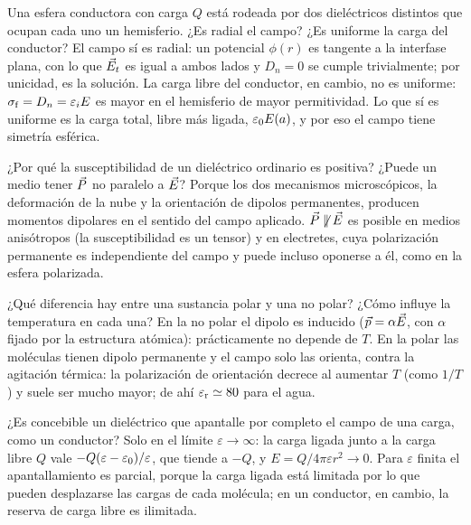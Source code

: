 \begin{pregunta}{Una esfera conductora con carga $Q$ está rodeada por dos dieléctricos distintos que ocupan cada uno un hemisferio. ¿Es radial el campo? ¿Es uniforme la carga del conductor?}
El campo sí es radial: un potencial $\phi(r)$ es tangente a la interfase plana, con lo que $\vec E_t$ es igual a ambos lados y $D_n=0$ se cumple
trivialmente; por unicidad, es la solución. La carga libre del conductor, en cambio, no es uniforme: $\sigma_{\mathrm f}=D_n=\varepsilon_iE$ es mayor en el
hemisferio de mayor permitividad. Lo que sí es uniforme es la carga total, libre más ligada, $\varepsilon_0 E(a)$, y por eso el campo tiene simetría esférica.
\end{pregunta}

\begin{pregunta}{¿Por qué la susceptibilidad de un dieléctrico ordinario es positiva? ¿Puede un medio tener $\vec P$ no paralelo a $\vec E$?}
Porque los dos mecanismos microscópicos, la deformación de la nube y la orientación de dipolos permanentes, producen momentos dipolares en el
sentido del campo aplicado. $\vec P\not\parallel\vec E$ es posible en medios anisótropos (la susceptibilidad es un tensor) y en electretes, cuya
polarización permanente es independiente del campo y puede incluso oponerse a él, como en la esfera polarizada.
\end{pregunta}

\begin{pregunta}{¿Qué diferencia hay entre una sustancia polar y una no polar? ¿Cómo influye la temperatura en cada una?}
En la no polar el dipolo es inducido ($\vec p=\alpha\vec E$, con $\alpha$ fijado por la estructura atómica): prácticamente no depende de $T$. En la polar las
moléculas tienen dipolo permanente y el campo solo las orienta, contra la agitación térmica: la polarización de orientación decrece al aumentar
$T$ (como $1/T$) y suele ser mucho mayor; de ahí $\varepsilon_{\mathrm r}\simeq80$ para el agua.
\end{pregunta}

\begin{pregunta}{¿Es concebible un dieléctrico que apantalle por completo el campo de una carga, como un conductor?}
Solo en el límite $\varepsilon\to\infty$: la carga ligada junto a la carga libre $Q$ vale $-Q(\varepsilon-\varepsilon_0)/\varepsilon$, que tiende a $-Q$, y $E=Q/4\pi\varepsilon r^2\to0$.
Para $\varepsilon$ finita el apantallamiento es parcial, porque la carga ligada está limitada por lo que pueden desplazarse las cargas de cada molécula;
en un conductor, en cambio, la reserva de carga libre es ilimitada.
\end{pregunta}

